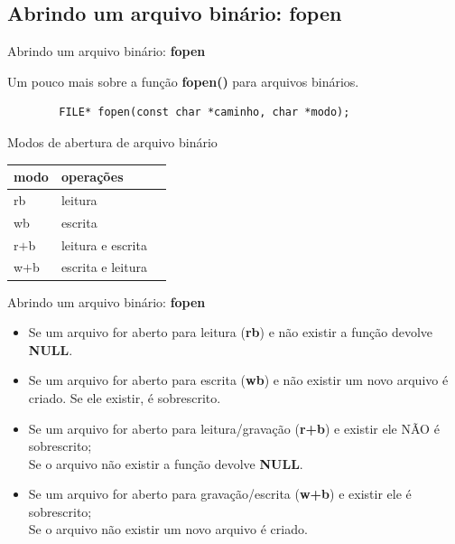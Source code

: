 \documentclass[handout]{beamer}
\begin{document}
\subsection{Abrindo um arquivo binário: fopen}

\begin{frame}[fragile]{Abrindo um arquivo binário: \textbf{fopen}}

    Um pouco mais sobre a função \textbf{fopen()} para arquivos binários.

    \begin{verbatim}
        FILE* fopen(const char *caminho, char *modo);
    \end{verbatim}

    \begin{block}{Modos de abertura de arquivo binário}
        \begin{center}
            \begin{tabular}{|l|l|l|} \hline
              modo & operações  \\\hline
              rb & leitura  \\\hline
              wb & escrita  \\\hline
              r$+$b & leitura e escrita \\\hline
              w$+$b & escrita  e leitura \\\hline
            \end{tabular}
        \end{center}
    \end{block}
\end{frame}

\begin{frame}[fragile]{Abrindo um arquivo binário: \textbf{fopen}}

    \begin{itemize}
        \item Se um arquivo for aberto para leitura (\textbf{rb}) e não existir a função devolve \textbf{NULL}.
        \item Se um arquivo for aberto para escrita (\textbf{wb}) e não existir um novo arquivo é criado. Se
        ele existir, é sobrescrito.
        \item Se um arquivo for aberto para leitura/gravação (\textbf{r+b}) e existir ele NÃO é sobrescrito; \\
        Se o arquivo não existir a função devolve \textbf{NULL}.
        \item Se um arquivo for aberto para gravação/escrita (\textbf{w+b}) e existir ele é sobrescrito; \\
        Se o arquivo não existir um novo arquivo é criado.
    \end{itemize}

\end{frame}
\end{document}
